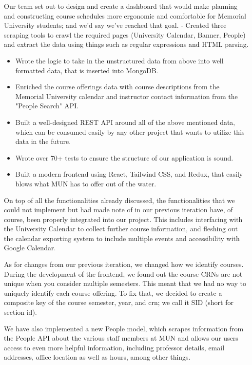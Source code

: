\documentclass[12pt]{article}
\begin{document}
	Our team set out to design and create a dashboard that would make planning and constructing course schedules more ergonomic and comfortable for Memorial University students; and we’d say we’ve reached that goal.
- Created three scraping tools to crawl the required pages (University Calendar, Banner, People) and extract the data using things such as regular expressions and HTML parsing.
\begin{itemize}
\item Wrote the logic to take in the unstructured data from above into well formatted data, that is inserted into MongoDB.

\item Enriched the course offerings data with course descriptions from the Memorial University calendar and instructor contact information from the "People Search" API.

\item Built a well-designed REST API around all of the above mentioned data, which can be consumed easily by any other project that wants to utilize this data in the future.

\item Wrote over 70+ tests to ensure the structure of our application is sound.

\item Built a modern frontend using React, Tailwind CSS, and Redux, that easily blows what MUN has to offer out of the water.
\end{itemize}
On top of all the functionalities already discussed, the functionalities that we could not implement but had made note of in our previous iteration have, of course, been properly integrated into our project. This includes interfacing with the University Calendar to collect further course information, and fleshing out the calendar exporting system to include multiple events and accessibility with Google Calendar. 

As for changes from our previous iteration, we changed how we identify courses. During the development of the frontend, we found out the course CRNs are not unique when you consider multiple semesters. This meant that we had no way to uniquely identify each course offering. To fix that, we decided to create a composite key of the course semester, year, and crn; we call it SID (short for section id). 

We have also implemented a new People model, which scrapes information from the People API about the various staff members at MUN and allows our users access to even more helpful information, including professor details, email addresses, office location as well as hours, among other things.
\end{document}
